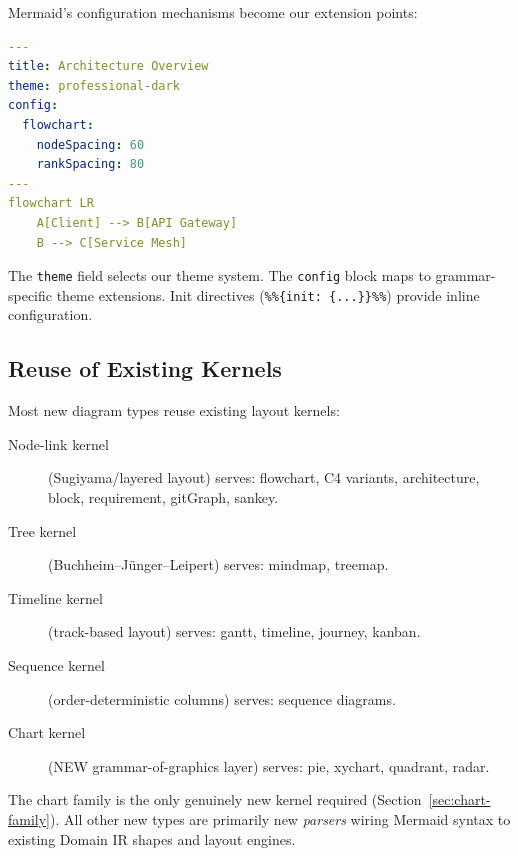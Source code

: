 Mermaid's configuration mechanisms become our extension points:

\begin{lstlisting}[language=yaml,caption={Mermaid frontmatter as theme/extension hook}]
---
title: Architecture Overview
theme: professional-dark
config:
  flowchart:
    nodeSpacing: 60
    rankSpacing: 80
---
flowchart LR
    A[Client] --> B[API Gateway]
    B --> C[Service Mesh]
\end{lstlisting}

The \texttt{theme} field selects our theme system. The \texttt{config} block maps to
grammar-specific theme extensions. Init directives (\texttt{\%\%\{init: \{...\}\}\%\%})
provide inline configuration.

\subsection{Reuse of Existing Kernels}

Most new diagram types reuse existing layout kernels:

\begin{description}
  \item[Node-link kernel] (Sugiyama/layered layout) serves: flowchart, C4 variants,
        architecture, block, requirement, gitGraph, sankey.
  \item[Tree kernel] (Buchheim--J\"unger--Leipert) serves: mindmap, treemap.
  \item[Timeline kernel] (track-based layout) serves: gantt, timeline, journey, kanban.
  \item[Sequence kernel] (order-deterministic columns) serves: sequence diagrams.
  \item[Chart kernel] (NEW grammar-of-graphics layer) serves: pie, xychart, quadrant, radar.
\end{description}

The chart family is the only genuinely new kernel required (Section~\ref{sec:chart-family}).
All other new types are primarily new \emph{parsers} wiring Mermaid syntax to existing
Domain IR shapes and layout engines.

